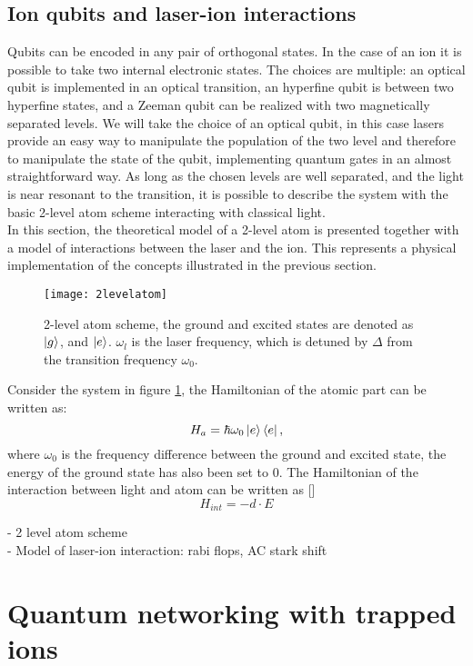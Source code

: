 \subsection{Ion qubits and laser-ion interactions}
Qubits can be encoded in any pair of orthogonal states. In the case of an ion it is possible to take two internal electronic states. The choices are multiple: an optical qubit is implemented in an optical transition, an hyperfine qubit is between two hyperfine states, and a Zeeman qubit can be realized with two magnetically separated levels. We will take the choice of an optical qubit, in this case lasers provide an easy way to manipulate the population of the two level and therefore to manipulate the state of the qubit, implementing quantum gates in an almost straightforward way. As long as the chosen levels are well separated, and the light is near resonant to the transition, it is possible to describe the system with the basic 2-level atom scheme interacting with classical light. \\
In this section, the theoretical model of a 2-level atom is presented together with a model of interactions between the laser and the ion. This represents a physical implementation of the concepts illustrated in the previous section.
\begin{figure}[H]
\centering
\texttt{[image: 2levelatom]}
\caption{2-level atom scheme, the ground and excited states are denoted as $\ket{g}$, and $\ket{e}$. $\omega_l$ is the laser frequency, which is detuned by $\Delta$ from the transition frequency $\omega_0$.}
\label{2levelatom}
\end{figure}

Consider the system in figure \ref{2levelatom}, the Hamiltonian of the atomic part can be written as:
\begin{equation}
H_a = \hbar\omega_0 \ket{e}\bra{e},
\end{equation}
where $\omega_0$ is the frequency difference between the ground and excited state, the energy of the ground state has also been set to 0. The Hamiltonian of the interaction between light and atom can be written as []
\begin{equation}
H_{int} = -d\cdot E
\end{equation}


- 2 level atom scheme\\
- Model of laser-ion interaction: rabi flops, AC stark shift
\section{Quantum networking with trapped ions}
